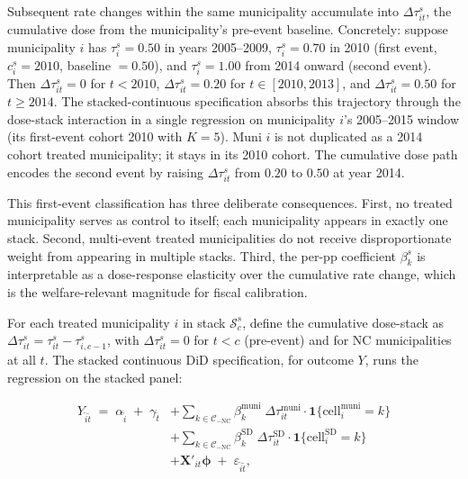 \documentclass[12pt]{article}
\begin{document}
Subsequent rate changes within the same municipality accumulate into
$\Delta\tau^s_{it}$, the cumulative dose from the municipality's
pre-event baseline. Concretely: suppose municipality $i$ has $\tau^s_i = 0.50$
in years 2005--2009, $\tau^s_i = 0.70$ in 2010 (first event,
$c^s_i = 2010$, baseline $= 0.50$), and $\tau^s_i = 1.00$ from 2014
onward (second event). Then $\Delta\tau^s_{it} = 0$ for $t < 2010$,
$\Delta\tau^s_{it} = 0.20$ for $t \in [2010, 2013]$, and
$\Delta\tau^s_{it} = 0.50$ for $t \geq 2014$. The stacked-continuous
specification absorbs this trajectory through the dose-stack
interaction in a single regression on municipality $i$'s 2005--2015 window
(its first-event cohort 2010 with $K = 5$). Muni $i$ is not
duplicated as a 2014 cohort treated municipality; it stays in its 2010
cohort. The cumulative dose path encodes the second event by raising
$\Delta\tau^s_{it}$ from $0.20$ to $0.50$ at year 2014.

This first-event classification has three deliberate consequences.
First, no treated municipality serves as control to itself; each municipality appears
in exactly one stack. Second, multi-event treated municipalities do not receive
disproportionate weight from appearing in multiple stacks. Third, the
per-pp coefficient $\beta^s_k$ is interpretable as a dose-response
elasticity over the cumulative rate change, which is the
welfare-relevant magnitude for fiscal calibration.

For each treated municipality $i$ in stack $\mathcal{S}^s_c$, define the
cumulative dose-stack as
$\Delta\tau^s_{it} = \tau^s_{it} - \tau^s_{i, c-1}$, with
$\Delta\tau^s_{it} = 0$ for $t < c$ (pre-event) and for NC municipalities at
all $t$. The stacked continuous DiD specification, for outcome $Y$,
runs the regression on the stacked panel:

\begin{equation}
\begin{split}
Y_{\tilde{i}\tilde{t}} \;=\; \alpha_{\tilde{i}} \;+\; \gamma_{\tilde{t}}
&+ \sum_{k \in \mathcal{C}_{-\text{NC}}} \beta^{\text{muni}}_k \;\Delta\tau^{\text{muni}}_{it} \cdot \mathbf{1}\{\text{cell}^{\text{muni}}_i = k\} \\
&+ \sum_{k \in \mathcal{C}_{-\text{NC}}} \beta^{\text{SD}}_k  \;\Delta\tau^{\text{SD}}_{it}   \cdot \mathbf{1}\{\text{cell}^{\text{SD}}_i = k\}   \\
&+ \mathbf{X}'_{it}\boldsymbol{\phi}
\;+\; \varepsilon_{\tilde{i}\tilde{t}},
\end{split}
\label{eq:headline}
\end{equation}
\end{document}
